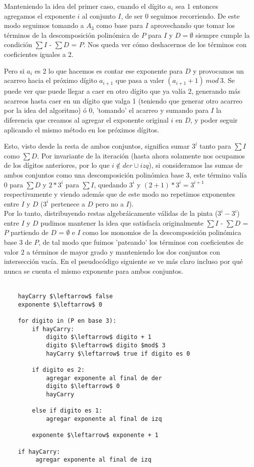 	Manteniendo la idea del primer caso, cuando el dígito $a_i$ sea 1 entonces agregamos el exponente $i$ al conjunto $I$, de ser 0 seguimos recorriendo. De este modo seguimos tomando a $A_3$ como base para $I$ aprovechando que tomar los términos de la descomposición polinómica de $P$ para $I$ y $D = \emptyset$ siempre cumple la condición $\sum I$ - $\sum D$ = $P$. Nos queda ver cómo deshacernos de los términos con coeficientes iguales a 2.

	Pero si $a_i$ es 2 lo que hacemos es contar ese exponente para $D$ y provocamos un acarreo hacia el próximo dígito $a_{i+1}$ que pasa a valer $(a_{i+1} + 1) \ mod \ 3$. Se puede ver que puede llegar a caer en otro dígito que ya valía 2, generando más acarreos hasta caer en un dígito que valga 1 (teniendo que generar otro acarreo por la idea del algoritmo) ó 0, 'tomando' el acarreo y sumando para $I$ la diferencia que creamos al agregar el exponente original $i$ en $D$, y poder seguir aplicando el mismo método en los próximos dígitos.

	Esto, visto desde la resta de ambos conjuntos, significa sumar $3^{i}$ tanto para $\sum I$ como $\sum D$. Por invariante de la iteración (hasta ahora solamente nos ocupamos de los dígitos anteriores, por lo que $i \notin der \cup izq$), si consideramos las sumas de ambos conjuntos como una descomposición polinómica base 3, este término valía 0 para $\sum D$ y $2*3^{i}$ para $\sum I$, quedando $3^{i}$ y $(2+1)*3^{i} = 3^{i+1}$ respectivamente y viendo además que de este modo no repetimos exponentes entre $I$ y $D$ ($3^i$ pertenece a $D$ pero no a $I$).
	\\
	
	Por lo tanto, distribuyendo restas algebráicamente válidas de la pinta ($3^{i}-3^{i}$) entre $I$ y $D$ pudimos mantener la idea que satisfacía originalmente $\sum I$ - $\sum D$ = $P$ partiendo de $D$ = $\emptyset$ e $I$ como los monomios de la descomposición polinómica base 3 de $P$, de tal modo que fuimos 'pateando' los términos con coeficientes de valor 2 a términos de mayor grado y manteniendo los dos conjuntos con intersección vacía. En el pseudocódigo siguiente se ve más claro incluso por qué nunca se cuenta el mismo exponente para ambos conjuntos.
\\
\\
\lstset{basicstyle=\large}
\begin{lstlisting}
    hayCarry $\leftarrow$ false				
    exponente $\leftarrow$ 0

    for digito in (P en base 3):
        if hayCarry:
            digito $\leftarrow$ digito + 1
            digito $\leftarrow$ digito $mod$ 3
            hayCarry $\leftarrow$ true if digito es 0

        if digito es 2:
            agregar exponente al final de der
            digito $\leftarrow$ 0
            hayCarry

        else if digito es 1:
            agregar exponente al final de izq

        exponente $\leftarrow$ exponente + 1

    if hayCarry:
         agregar exponente al final de izq

\end{lstlisting}

